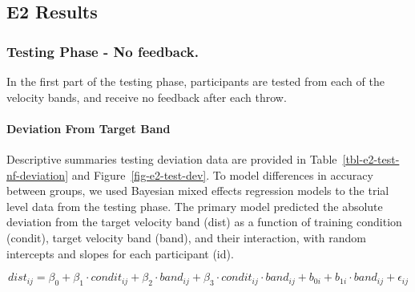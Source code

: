 \documentclass[
  letterpaper,
  DIV=11,
  numbers=noendperiod,
  oneside]{scrartcl}
\let\oldparagraph\paragraph
\renewcommand{\paragraph}[1]{\oldparagraph{#1}\mbox{}}
\begin{document}
\subsection{E2 Results}\label{e2-results}

\subsubsection{Testing Phase - No
feedback.}\label{testing-phase---no-feedback.-1}

In the first part of the testing phase, participants are tested from
each of the velocity bands, and receive no feedback after each throw.

\paragraph{Deviation From Target
Band}\label{deviation-from-target-band-1}

Descriptive summaries testing deviation data are provided in
Table~\ref{tbl-e2-test-nf-deviation} and Figure~\ref{fig-e2-test-dev}.
To model differences in accuracy between groups, we used Bayesian mixed
effects regression models to the trial level data from the testing
phase. The primary model predicted the absolute deviation from the
target velocity band (dist) as a function of training condition
(condit), target velocity band (band), and their interaction, with
random intercepts and slopes for each participant (id).

\begin{equation}
dist_{ij} = \beta_0 + \beta_1 \cdot condit_{ij} + \beta_2 \cdot band_{ij} + \beta_3 \cdot condit_{ij} \cdot band_{ij} + b_{0i} + b_{1i} \cdot band_{ij} + \epsilon_{ij}
\end{equation}
\end{document}
